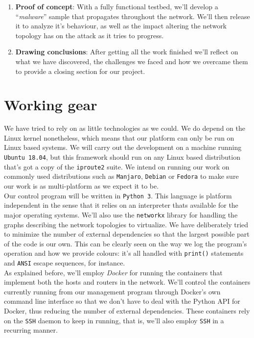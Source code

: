 \documentclass[12pt]{article}
\begin{document}
\begin{enumerate}
            \item \textbf{Proof of concept}: With a fully functional testbed, we'll develop a ``\textit{malware}'' sample that propagates throughout the network. We'll then release it to analyze it's behaviour, as well as the impact altering the network topology has on the attack as it tries to progress.

            \item \textbf{Drawing conclusions}: After getting all the work finished we'll reflect on what we have discovered, the challenges we faced and how we overcame them to provide a closing section for our project.
        \end{enumerate}

    \section{Working gear}
        We have tried to rely on as little technologies as we could. We do depend on the Linux kernel nonetheless, which means that our platform can only be run on Linux based systems. We will carry out the development on a machine running \texttt{Ubuntu 18.04}, but this framework should run on any Linux based distribution that's got a copy of the \texttt{iproute2} suite. We intend on running our work on commonly used distributions such as \texttt{Manjaro}, \texttt{Debian} or \texttt{Fedora} to make sure our work is as multi-platform as we expect it to be.\\

        Our control program will be written in \texttt{Python 3}. This language is platform independent in the sense that it relies on an interpreter thats available for the major operating systems. We'll also use the \texttt{networkx} library for handling the graphs describing the network topologies to virtualize. We have deliberately tried to minimize the number of external dependencies so that the largest possible part of the code is our own. This can be clearly seen on the way we log the program's operation and how we provide colours: it's all handled with \texttt{print()} statements and \texttt{ANSI} escape sequences, for instance.\\

        As explained before, we'll employ \textit{Docker} for running the containers that implement both the hosts and routers in the network. We'll control the containers currently running from our management program through Docker's own command line interface so that we don't have to deal with the Python API for Docker, thus reducing the number of external dependencies. These containers rely on the \texttt{SSH} daemon to keep in running, that is, we'll also employ \texttt{SSH} in a recurring manner.\\
\end{document}
